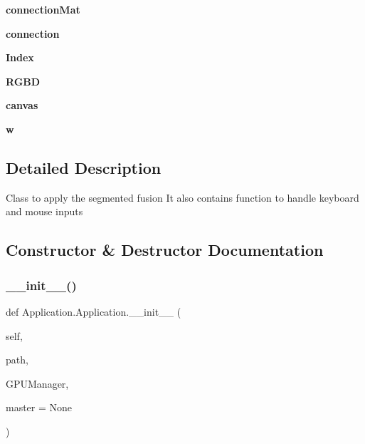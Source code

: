 \begin{DoxyCompactItemize}
\mbox{\label{class_application_1_1_application_a2f8ef7d7d559d8a1fc7cdb4ab7dfedb7}} 
{\bfseries connection\+Mat}
\item 
\mbox{\label{class_application_1_1_application_a7b6a9840a20831ee3603358f862d8dac}} 
{\bfseries connection}
\item 
\mbox{\label{class_application_1_1_application_a3e83156042a91a7ac51b43a212af1b15}} 
{\bfseries Index}
\item 
\mbox{\label{class_application_1_1_application_af014bd8cb86e29f59612d916bf086776}} 
{\bfseries R\+G\+BD}
\item 
\mbox{\label{class_application_1_1_application_ad24990f1b38142dd639d7bd895638de7}} 
{\bfseries canvas}
\item 
\mbox{\label{class_application_1_1_application_a252c7894fa91a112d1238a760346d6b9}} 
{\bfseries w}
\end{DoxyCompactItemize}


\subsection{Detailed Description}
\begin{DoxyVerb}Class to apply the segmented fusion
It also contains function to handle keyboard and mouse inputs
\end{DoxyVerb}
 

\subsection{Constructor \& Destructor Documentation}
\mbox{\label{class_application_1_1_application_a0a1efa05f27e797bfc72d43dd12df6b5}} 
\subsubsection{\+\_\+\+\_\+init\+\_\+\+\_\+()}
{\footnotesize\ttfamily def Application.\+Application.\+\_\+\+\_\+init\+\_\+\+\_\+ (\begin{DoxyParamCaption}\item[{}]{self,  }\item[{}]{path,  }\item[{}]{G\+P\+U\+Manager,  }\item[{}]{master = {\ttfamily None} }\end{DoxyParamCaption})}



